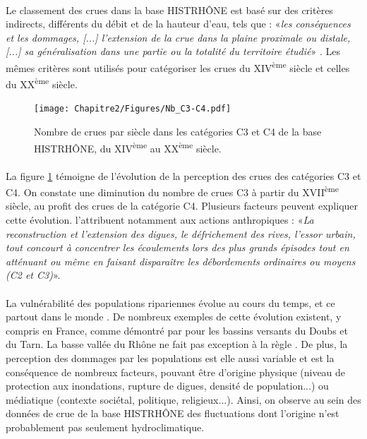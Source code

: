 	\paragraph{} Le classement des crues dans la base HISTRHÔNE est basé sur des critères indirects, différents du débit et de la hauteur d'eau, tels que : «\textit{les conséquences et les dommages, [...] l'extension de la crue dans la plaine proximale ou distale, [...] sa généralisation dans une partie ou la totalité du territoire étudié}» \citep{pichard_sept_2014}. Les mêmes critères sont utilisés pour catégoriser les crues du XIV\textsuperscript{ème} siècle et celles du XX\textsuperscript{ème} siècle. 
	
	\begin{figure}[h]
	\centering
		\texttt{[image: Chapitre2/Figures/Nb\_C3-C4.pdf]}
        \caption{Nombre de crues par siècle dans les catégories C3 et C4 de la base HISTRHÔNE, du XIV\textsuperscript{ème} au XX\textsuperscript{ème} siècle.}
		\label{fig:Nb_C3C4}
	\end{figure}	
	
	\paragraph{} La figure \ref{fig:Nb_C3C4} témoigne de l'évolution de la perception des crues des catégories C3 et C4. On constate une diminution du nombre de crues C3 à partir du XVII\textsuperscript{ème} siècle, au profit des crues de la catégorie C4. Plusieurs facteurs peuvent expliquer cette évolution. \citet{pichard_sept_2014} l'attribuent notamment aux actions anthropiques : «\textit{La reconstruction et l'extension des digues, le défrichement des rives, l'essor urbain, tout concourt à concentrer les écoulements lors des plus grands épisodes tout en atténuant ou même en faisant disparaître les débordements ordinaires ou moyens (C2 et C3)}». 
	
	\paragraph{} La vulnérabilité des populations ripariennes évolue au cours du temps, et ce partout dans le monde \citep{kron_flood_2002}. De nombreux exemples de cette évolution existent, y compris en France, comme démontré par \citet{boudou_assessing_2016} pour les bassins versants du Doubs et du Tarn. La basse vallée du Rhône ne fait pas exception à la règle \citep{piegay_observatoire_2022}. De plus, la perception des dommages par les populations est elle aussi variable et est la conséquence de nombreux facteurs, pouvant être d'origine physique (niveau de protection aux inondations, rupture de digues, densité de population...) ou médiatique (contexte sociétal, politique, religieux...). Ainsi, on observe au sein des données de crue de la base HISTRHÔNE des fluctuations dont l'origine n'est probablement pas seulement hydroclimatique. 
	
